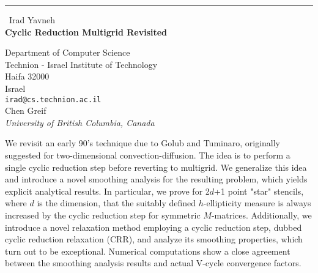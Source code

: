 \documentclass{report}
\begin{document}
\begin{center}
\rule{6in}{1pt} \
{\large Irad Yavneh \\
{\bf Cyclic Reduction Multigrid Revisited}}

Department of Computer Science \\ Technion - Israel Institute of Technology \\ Haifa 32000 \\ Israel
\\
{\tt irad@cs.technion.ac.il}\\
Chen Greif\\
{\em University of British Columbia, Canada}\end{center}

We revisit an early 90's technique due to Golub and Tuminaro, originally
suggested for two-dimensional convection-diffusion. The idea is to
perform a single cyclic reduction step before reverting to multigrid. We
generalize this idea and introduce a novel smoothing analysis for the
resulting problem, which yields explicit analytical results. In
particular, we prove for 2$d$+1 point "star" stencils, where $d$ is the
dimension, that the suitably defined $h$-ellipticity measure is always
increased by the cyclic reduction step for symmetric $M$-matrices.
Additionally, we introduce a novel relaxation method employing a cyclic
reduction step, dubbed cyclic reduction relaxation (CRR), and analyze its
smoothing properties, which turn out to be exceptional. Numerical
computations show a close agreement between the smoothing analysis
results and actual V-cycle convergence factors.
\end{document}
